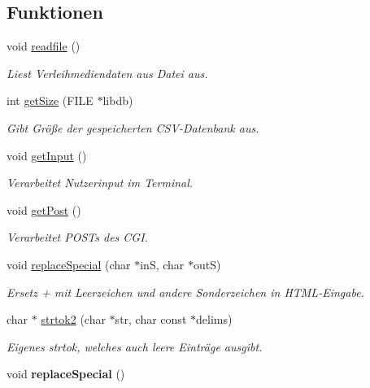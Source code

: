 \subsection*{Funktionen}
\begin{DoxyCompactItemize}
\item 
void \hyperlink{group___lend_lib_in_gabd7e68463503c5745a70e1d19c66f812}{readfile} ()
\begin{DoxyCompactList}\small\item\em Liest Verleihmediendaten aus Datei aus. \end{DoxyCompactList}\item 
int \hyperlink{group___lend_lib_in_ga6630e38513358b73fa2ce1c1f6cb71cb}{get\+Size} (F\+I\+LE $\ast$libdb)
\begin{DoxyCompactList}\small\item\em Gibt Größe der gespeicherten C\+S\+V-\/\+Datenbank aus. \end{DoxyCompactList}\item 
void \hyperlink{group___lend_lib_in_ga46d47190cb20b54826fb665f1859968f}{get\+Input} ()
\begin{DoxyCompactList}\small\item\em Verarbeitet Nutzerinput im Terminal. \end{DoxyCompactList}\item 
void \hyperlink{group___lend_lib_in_ga1817e73244fbbe5d1ae571f6010404ee}{get\+Post} ()
\begin{DoxyCompactList}\small\item\em Verarbeitet P\+O\+S\+Ts des C\+GI. \end{DoxyCompactList}\item 
void \hyperlink{group___lend_lib_in_ga46e2e4a786681c507f83d84e75c214e2}{replace\+Special} (char $\ast$inS, char $\ast$outS)
\begin{DoxyCompactList}\small\item\em Ersetz \textquotesingle{}+\textquotesingle{} mit Leerzeichen und andere Sonderzeichen in H\+T\+M\+L-\/\+Eingabe. \end{DoxyCompactList}\item 
char $\ast$ \hyperlink{group___lend_lib_in_gaccb55b34bbc589d5c47830fdcd889e17}{strtok2} (char $\ast$str, char const $\ast$delims)
\begin{DoxyCompactList}\small\item\em Eigenes strtok, welches auch leere Einträge ausgibt. \end{DoxyCompactList}\item 
void {\bfseries replace\+Special} ()\hypertarget{group___lend_lib_in_gaa0229b9cd129793927019728b8d6d8c0}{}\label{group___lend_lib_in_gaa0229b9cd129793927019728b8d6d8c0}

\end{DoxyCompactItemize}
